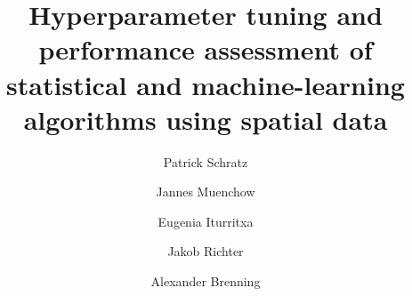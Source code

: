 \documentclass[review]{elsarticle}
\begin{document}
\begin{frontmatter}

	\title{Hyperparameter tuning and performance assessment of statistical and machine-learning algorithms using spatial data}

	\author[FSU]{Patrick Schratz}

	\author[FSU]{Jannes Muenchow}
	\author[NEIKER]{Eugenia Iturritxa}
	\author[TUDO]{Jakob Richter}
	\author[FSU]{Alexander Brenning}

	\address[FSU]{Department of Geography, GIScience group, Grietgasse 6, 07743, Jena, Germany}
	\address[NEIKER]{NEIKER, Granja Modelo –Arkaute, Apdo. 46, 01080 Vitoria-Gasteiz, Arab, Spain}
	\address[TUDO]{Department of Statistics, TU Dortmund University, Germany}


\end{frontmatter}
\end{document}
